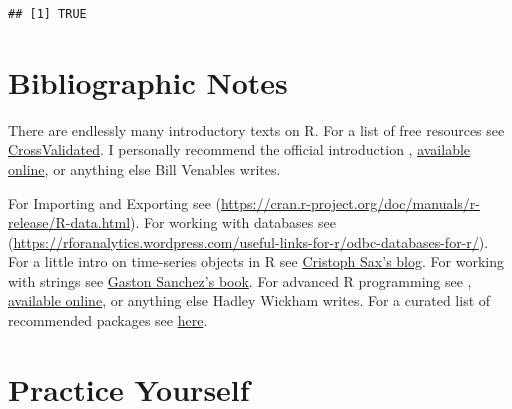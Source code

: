 \documentclass[]{book}
\theoremstyle{definition}
\theoremstyle{definition}
\theoremstyle{definition}
\theoremstyle{remark}
\begin{document}
\begin{verbatim}
## [1] TRUE
\end{verbatim}

\section{Bibliographic Notes}\label{bibliographic-notes-1}

There are endlessly many introductory texts on R. For a list of free
resources see
\href{http://stats.stackexchange.com/questions/138/free-resources-for-learning-r}{CrossValidated}.
I personally recommend the official introduction
\citet{venables2004introduction},
\href{https://cran.r-project.org/doc/manuals/r-release/R-intro.pdf}{available
online}, or anything else Bill Venables writes.

For Importing and Exporting see
(\url{https://cran.r-project.org/doc/manuals/r-release/R-data.html}).
For working with databases see
(\url{https://rforanalytics.wordpress.com/useful-links-for-r/odbc-databases-for-r/}).
For a little intro on time-series objects in R see
\href{http://www.christophsax.com/2018/05/15/tsbox/}{Cristoph Sax's
blog}. For working with strings see
\href{http://www.gastonsanchez.com/r4strings/}{Gaston Sanchez's book}.
For advanced R programming see \citet{wickham2014advanced},
\href{http://adv-r.had.co.nz/}{available online}, or anything else
Hadley Wickham writes. For a curated list of recommended packages see
\href{https://github.com/rstudio/RStartHere/blob/master/README.md}{here}.

\section{Practice Yourself}\label{practice-yourself}
\end{document}
